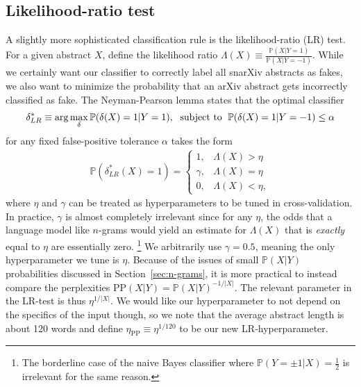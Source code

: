 \documentclass{article}
\renewcommand{\P}{\mathbb{P}}
\begin{document}
\subsection{Likelihood-ratio test}
A slightly more sophisticated classification rule is the likelihood-ratio (LR) test.
For a given abstract $X$, define the likelihood ratio $\Lambda(X)\equiv\frac{\P(X|Y=1)}{\P(X|Y=-1)}$.
While we certainly want our classifier to correctly label all snarXiv abstracts as fakes, we also want to minimize the probability that an arXiv abstract gets incorrectly classified as fake.
The Neyman-Pearson lemma states that the optimal classifier
\begin{align}
  \delta_{LR}^* \equiv \arg\max_\delta \P(\delta(X)=1|Y=1), \text{\; subject to \;} \P(\delta(X)=1|Y=-1)\leq \alpha
\end{align}
for any fixed false-positive tolerance $\alpha$ takes the form
\begin{align}
  \P\left(\delta_{LR}^*(X)=1\right) =
  \begin{cases}
    1,  & \Lambda(X) > \eta \\
    \gamma, & \Lambda(X) = \eta \\
    0,  & \Lambda(X) < \eta,
  \end{cases}
\end{align}
where $\eta$ and $\gamma$ can be treated as hyperparameters to be tuned in cross-validation.
In practice, $\gamma$ is almost completely irrelevant since for any $\eta$, the odds that a language model like $n$-grams would yield an estimate for $\Lambda(X)$ that is \textit{exactly} equal to $\eta$ are essentially zero.%
\footnote{The borderline case of the naive Bayes classifier where $\P(Y=\pm1|X)=\frac{1}{2}$ is irrelevant for the same reason.}
%
We arbitrarily use $\gamma=0.5$, meaning the only hyperparameter we tune is $\eta$.
Because of the issues of small $\P(X|Y)$ probabilities discussed in Section~\ref{sec:n-grams}, it is more practical to instead compare the perplexities $\text{PP}(X|Y)=\P(X|Y)^{-1/|X|}$.
The relevant parameter in the LR-test is thus $\eta^{1/|X|}$. We would like our hyperparameter to not depend on the specifics of the input though, so we note that the average abstract length is about 120 words and define $\eta_\text{PP}\equiv \eta^{1/120}$ to be our new LR-hyperparameter.
\end{document}
